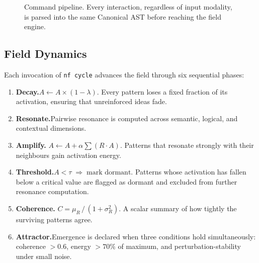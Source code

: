 \begin{figure}[htbp]
\centering
{}
\caption{Command pipeline.  Every interaction, regardless of input
  modality, is parsed into the same Canonical AST before reaching the
  field engine.}
\label{fig:command-pipeline}
\end{figure}

\subsection{Field Dynamics}\label{sec:field-dynamics}

Each invocation of \texttt{nf cycle} advances the field through six
sequential phases:

\begin{enumerate}[nosep]
  \item \textbf{Decay.}\quad $A \leftarrow A \times (1 - \lambda)$.
        Every pattern loses a fixed fraction of its activation, ensuring
        that unreinforced ideas fade.
  \item \textbf{Resonate.}\quad Pairwise resonance is computed across
        semantic, logical, and contextual dimensions.
  \item \textbf{Amplify.}\quad
        $A \leftarrow A + \alpha \sum (R \cdot A)$.
        Patterns that resonate strongly with their neighbours gain
        activation energy.
  \item \textbf{Threshold.}\quad $A < \tau \;\Rightarrow\;
        \text{mark dormant}$.  Patterns whose activation has fallen
        below a critical value are flagged as dormant and excluded from
        further resonance computation.
  \item \textbf{Coherence.}\quad
        $C = \mu_R\, / \,(1 + \sigma^{2}_R)$.
        A scalar summary of how tightly the surviving patterns agree.
  \item \textbf{Attractor.}\quad Emergence is declared when three
        conditions hold simultaneously:
        coherence $> 0.6$, energy $> 70\%$ of maximum, and
        perturbation-stability under small noise.
\end{enumerate}

